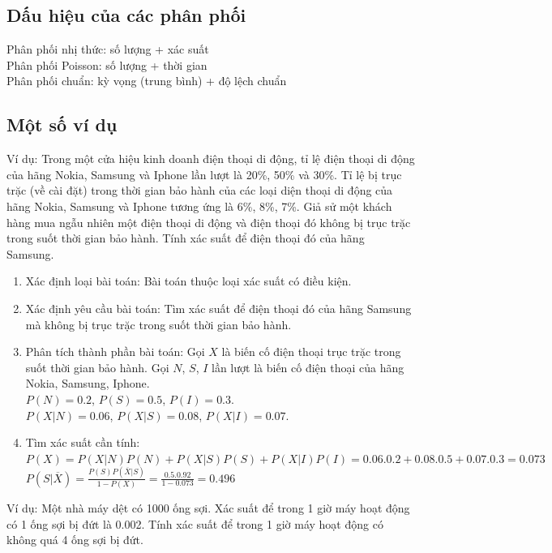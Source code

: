 \documentclass[12pt]{article}
\def\bar#1{\overline{#1}}
\begin{document}
\subsection{Dấu hiệu của các phân phối}
Phân phối nhị thức: số lượng + xác suất \\
Phân phối Poisson: số lượng + thời gian \\
Phân phối chuẩn: kỳ vọng (trung bình) + độ lệch chuẩn \\

\subsection{Một số ví dụ}
Ví dụ: Trong một cửa hiệu kinh doanh điện thoại di động, tỉ lệ điện
thoại di động của hãng Nokia, Samsung và Iphone lần lượt là 20\%, 50\% và 30\%. Tỉ
lệ bị trục trặc (về cài đặt) trong thời gian bảo hành của các loại diện thoại di động
của hãng Nokia, Samsung và Iphone tương ứng là 6\%, 8\%, 7\%. Giả sử một khách
hàng mua ngẫu nhiên một điện thoại di động và điện thoại đó không bị trục trặc
trong suốt thời gian bảo hành. Tính xác suất để điện thoại đó của hãng Samsung.
\begin{enumerate}
    \item Xác định loại bài toán: Bài toán thuộc loại xác suất có điều kiện.
    \item Xác định yêu cầu bài toán: Tìm xác suất để điện thoại đó của hãng Samsung mà không bị trục trặc trong suốt thời gian bảo hành.
    \item Phân tích thành phần bài toán:
    \subitem Gọi $X$ là biến cố điện thoại trục trặc trong suốt thời gian bảo hành.
    \subitem Gọi $N$, $S$, $I$ lần lượt là biến cố điện thoại của hãng Nokia, Samsung, Iphone. \\ $P(N) = 0.2$, $P(S) = 0.5$, $P(I) = 0.3$.
    \\ $P(X|N) = 0.06$, $P(X|S) = 0.08$, $P(X|I) = 0.07$.
    \item Tìm xác suất cần tính: \\
    $P(X) = P(X|N)P(N) + P(X|S)P(S) + P(X|I)P(I) = 0.06 . 0.2 + 0.08 . 0.5 + 0.07 . 0.3 = 0.073$ \\
    $P(S|\bar{X}) = \frac{P(S)P(\bar{X}|S)}{1-P(X)} = \frac{0.5 . 0.92}{1-0.073} = 0.496$

\end{enumerate}
Ví dụ: Một nhà máy dệt có 1000 ống sợi. Xác suất để trong 1 giờ máy
hoạt động có 1 ống sợi bị đứt là 0.002. Tính xác suất để trong 1 giờ máy hoạt động
có không quá 4 ống sợi bị đứt.
\end{document}
